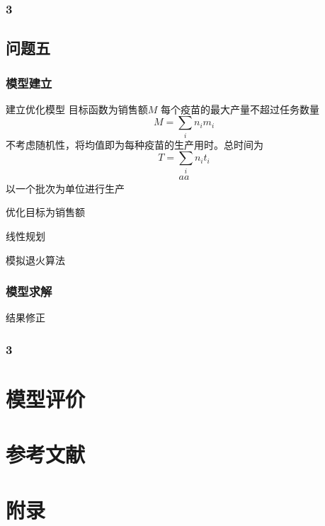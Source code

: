 \documentclass[UTF8]{ctexart}
\begin{document}
	\subsubsection{3}
	
	\subsection{问题五}
	\subsubsection{模型建立}
	建立优化模型
	目标函数为销售额$M$
	每个疫苗的最大产量不超过任务数量
	\begin{equation}
		M=\sum_{i}n_{i}m_{i}
	\end{equation}
	不考虑随机性，将均值即为每种疫苗的生产用时。总时间为
	\begin{equation}
		T=\sum_{i}n_{i}t_{i}
	\end{equation}
	\begin{equation}
	\begin{split}
		aa
	\end{split}
	\end{equation}
	以一个批次为单位进行生产
	\par 优化目标为销售额
	\par 线性规划
	\par 模拟退火算法
	\subsubsection{模型求解}
	结果修正
	\subsubsection{3}
	
	\section{模型评价}
	
	
	\section{参考文献}
	
	\section{附录}
	\begin{appendices}
		
	\end{appendices}
	
\end{document}
